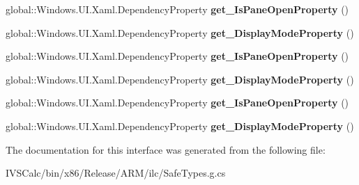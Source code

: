 \begin{DoxyCompactItemize}
global\+::\+Windows.\+U\+I.\+Xaml.\+Dependency\+Property {\bfseries get\+\_\+\+Is\+Pane\+Open\+Property} ()
\item 
\mbox{\label{interface_windows_1_1_u_i_1_1_xaml_1_1_controls_1_1_i_split_view_statics_a3f596e3498f63a30c52b09132463c084}} 
global\+::\+Windows.\+U\+I.\+Xaml.\+Dependency\+Property {\bfseries get\+\_\+\+Display\+Mode\+Property} ()
\item 
\mbox{\label{interface_windows_1_1_u_i_1_1_xaml_1_1_controls_1_1_i_split_view_statics_a159de52c3745095518a1e59fe0fde68f}} 
global\+::\+Windows.\+U\+I.\+Xaml.\+Dependency\+Property {\bfseries get\+\_\+\+Is\+Pane\+Open\+Property} ()
\item 
\mbox{\label{interface_windows_1_1_u_i_1_1_xaml_1_1_controls_1_1_i_split_view_statics_a3f596e3498f63a30c52b09132463c084}} 
global\+::\+Windows.\+U\+I.\+Xaml.\+Dependency\+Property {\bfseries get\+\_\+\+Display\+Mode\+Property} ()
\item 
\mbox{\label{interface_windows_1_1_u_i_1_1_xaml_1_1_controls_1_1_i_split_view_statics_a159de52c3745095518a1e59fe0fde68f}} 
global\+::\+Windows.\+U\+I.\+Xaml.\+Dependency\+Property {\bfseries get\+\_\+\+Is\+Pane\+Open\+Property} ()
\item 
\mbox{\label{interface_windows_1_1_u_i_1_1_xaml_1_1_controls_1_1_i_split_view_statics_a3f596e3498f63a30c52b09132463c084}} 
global\+::\+Windows.\+U\+I.\+Xaml.\+Dependency\+Property {\bfseries get\+\_\+\+Display\+Mode\+Property} ()
\end{DoxyCompactItemize}


The documentation for this interface was generated from the following file\+:\begin{DoxyCompactItemize}
\item 
I\+V\+S\+Calc/bin/x86/\+Release/\+A\+R\+M/ilc/Safe\+Types.\+g.\+cs\end{DoxyCompactItemize}
